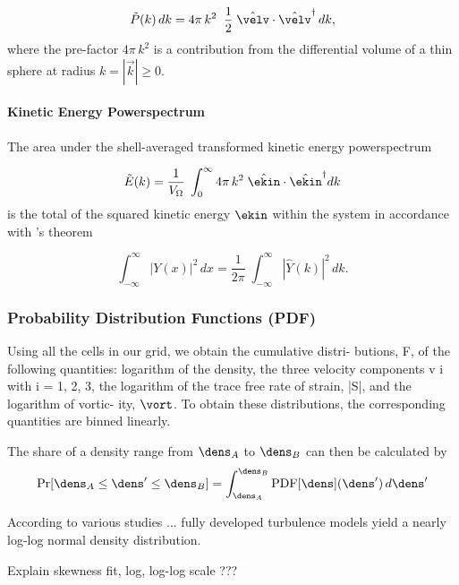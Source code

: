 \begin{equation}
    \tilde{P}(k)\,dk = 4 \pi\,k^2 \;\; \frac{1}{2} \; \hat{\velv} \cdot \hat{\velv}^{\dagger}\,dk,
\end{equation}
where the pre-factor $4 \pi\,k^2$ is a contribution from the differential
volume of a thin sphere at radius $k = |\vec{k}| \ge 0$.

\paragraph{Kinetic Energy Powerspectrum}
The area under the shell-averaged transformed kinetic energy powerspectrum

\begin{equation}
    \tilde{E}(k) = \frac{1}{V_{\Omega}} \; \int_0^\infty 4\pi\,k^2 \; \hat{\ekin} \cdot \hat{\ekin}^{\dagger} dk
\end{equation}
is the total of the squared kinetic energy $\ekin$ within the system in accordance
with 's theorem

\begin{equation}
    \int_{-\infty}^{\infty} |Y(x)|^2 \, dx = \frac{1}{2\pi} \; \int_{-\infty}^{\infty} |\hat{Y}(k)|^2 \,dk.
\end{equation}

\subsubsection{Probability Distribution Functions (PDF)}

Using all the cells in our grid, we obtain the cumulative distri-
butions, F, of the following quantities: logarithm of the density,
the three velocity components v i with i = 1, 2, 3, the logarithm
of the trace free rate of strain, |S|, and the logarithm of vortic-
ity, $\vort$. To obtain these distributions, the corresponding
quantities are binned linearly.


The share of a density range from $\dens_A$ to $\dens_B$ can then be calculated by
\begin{equation}
    \text{Pr}[\dens_A \le \dens' \le \dens_B] = \int_{\dens_A}^{\dens_B} \text{PDF}[\dens](\dens') \, d\dens'
\end{equation}

According to various studies ... fully developed turbulence models
yield a nearly log-log normal density distribution.

Explain skewness fit, log, log-log scale ???
